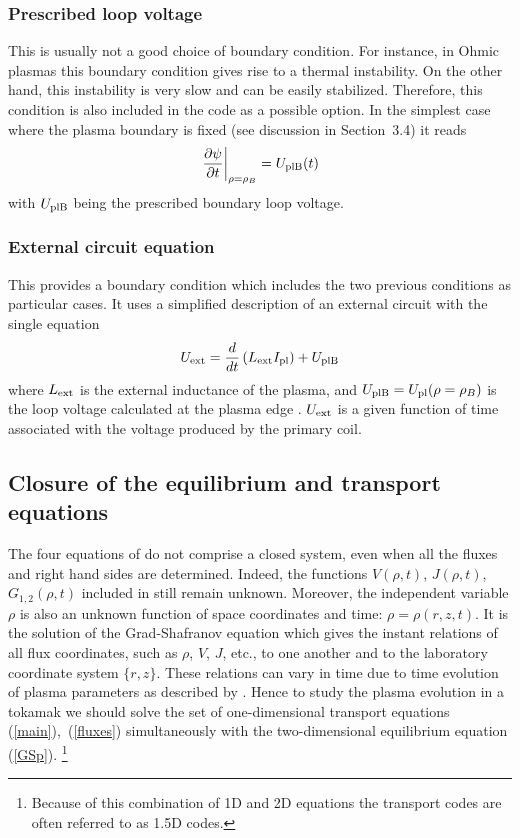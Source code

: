 \subsubsection{Prescribed loop voltage} 
This is usually not a good choice of boundary condition. 
For instance, in Ohmic plasmas this boundary condition gives rise to a
thermal instability. 
On the other hand, this instability is very slow and can be easily
stabilized. 
Therefore, this condition is also included in the code as a possible
option. 
In the simplest case where the plasma boundary is fixed (see discussion
in Section~3.4) it reads 
\begin{equation}\label{bcU}
\left.\displaystyle{\partial \psi\over\partial t}\right|_{\rho=\rho_B}
=U_{\rm plB}(t)
\end{equation}
with $U_{\rm plB}$ being the prescribed boundary loop voltage.

\subsubsection{External circuit equation} 
This provides a boundary condition which includes the two previous
conditions as particular cases. 
It uses a simplified description of an external circuit with the single
equation 
\begin{equation}\label{bcL}
U_{\rm ext}=\frac{d}{dt}\left(L_{\rm ext}I_{\rm pl}\right)+U_{\rm plB}
\end{equation}
where $L_{\rm ext}$ is the external inductance of the plasma, and 
$U_{\rm plB}=U_{\rm pl}(\rho=\rho_B)$
is the loop voltage calculated at the plasma edge .
$U_{\rm ext}$ is a given function of time associated with the voltage
produced by the primary coil. 

\subsection{Closure of the equilibrium and transport equations}

The four equations of  do not comprise a closed system, even
when all the fluxes and right hand sides are determined. 
Indeed, the functions $V(\rho,t)$, $J(\rho,t)$, $G_{1,2}(\rho,t)$
included in  still remain unknown. 
Moreover, the independent variable $\rho$ is also an unknown
function of space coordinates and time: $\rho=\rho(r,z,t)$. 
It is the solution of the Grad-Shafranov equation  which gives
the instant relations of all flux coordinates, such as $\rho$, $V$, $J$,
etc., to one another and to the laboratory coordinate system $\{r,z\}$. 
These relations can vary in time due to time evolution of plasma
parameters as described by . 
Hence to study the plasma evolution in a tokamak we should solve the set
of one-dimensional transport equations (\ref{main}),~(\ref{fluxes})
simultaneously with the two-dimensional equilibrium equation (\ref{GSp}).
\footnote{Because of this combination of 1D and 2D equations
the transport codes are often referred to as 1.5D codes.}

